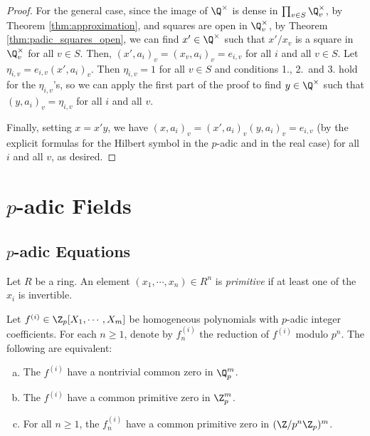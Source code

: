 \begin{proof}
For the general case, since the image of $\Q^\times$ is dense in $\prod_{v \in S} \Q_v^\times$, by
Theorem \ref{thm:approximation}, and squares are open in $\Q_v^\times$, by Theorem \ref{thm:padic_squares_open},
we can find $x' \in \Q^\times$ such that $x'/x_v$ is a square in $\Q_v^\times$ for all $v \in S$.
Then, $(x', a_i)_v = (x_v, a_i)_v = e_{i,v}$ for all $i$ and all $v \in S$.
Let $\eta_{i,v}= e_{i,v} (x', a_i)_v$. Then $\eta_{i,v}=1$ for all $v \in S$ and conditions 1., 2.\
and 3. hold for the $\eta_{i,v}$'s, so we can apply the first part of the proof to find $y \in \Q^\times$
such that $(y, a_i)_v = \eta_{i,v}$ for all $i$ and all $v$.

Finally, setting $x = x' y$, we have $(x, a_i)_v = (x', a_i)_v (y, a_i)_v = e_{i,v}$ (by the explicit
formulas for the Hilbert symbol in the $p$-adic and in the real case) for all $i$ and all $v$, as desired.
\end{proof}


\chapter[p-adic Fields]{$p$-adic Fields}

\section[p-adic Equations]{$p$-adic Equations}\label{sec:padic_equations}

\begin{definition}\label{def:primitive}
\leanok
Let $R$ be a ring. An element $(x_1, \cdots, x_n) \in R^n$ is \emph{primitive} if at least one of the $x_i$ is invertible.
\end{definition}


\begin{proposition}\label{prop:common_root}
\leanok
{}
Let $f^{(i)} \in \Z_p[X_1, \cdots, X_m]$ be homogeneous polynomials with $p$-adic integer coefficients. For each $n \ge 1$, denote by $f_n^{(i)}$ the reduction of $f^{(i)}$ modulo $p^n$.
 The following are equivalent:
\begin{enumerate}[a)]
\leanok
\item The $f^{(i)}$ have a nontrivial common zero in $\Q_p^m$.
\item The $f^{(i)}$ have a common primitive zero in $\Z_p^m$.
\item For all $n \ge 1$, the $f_n^{(i)}$ have a common primitive zero in $(\Z / p^n \Z_p)^m$.
\end{enumerate}
\end{proposition}

